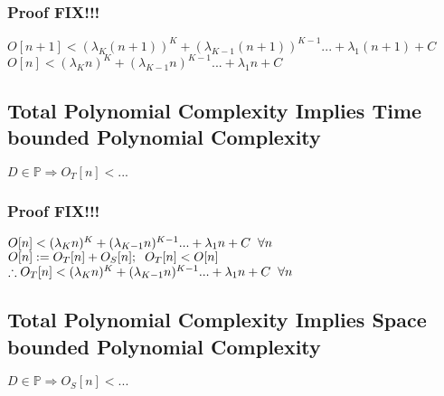 \documentclass[11pt]{article}
\begin{document}
\subsubsection{Proof FIX!!!}
\begin{center}
$
O[n+1] < (\lambda_K (n+1))^K + (\lambda_{K-1} (n+1))^{K-1}... + \lambda_1 (n+1) + C
$
\\ \vspace{2mm}
$
O[n] < (\lambda_K n)^K + (\lambda_{K-1} n)^{K-1}... + \lambda_1 n + C
$
\end{center}







\subsection{Total Polynomial Complexity Implies Time bounded Polynomial Complexity}
\begin{center}
\vspace{1mm}
$
D \in \mathbb{P} \Longrightarrow O_T[n] < ...
$
\end{center}

\subsubsection{Proof FIX!!!}
\begin{center}
$
O[n] < (\lambda_K n)^K + (\lambda_{K-1} n)^{K-1}... + \lambda_1 n + C \hspace{2mm} \forall n
$
\\ \vspace{2mm}
$
O[n] := O_T[n] + O_S[n]; \hspace{2mm} O_T[n] < O[n]
$
\\ \vspace{2mm}
$
\therefore O_T[n] < (\lambda_K n)^K + (\lambda_{K-1} n)^{K-1}... + \lambda_1 n + C \hspace{2mm} \forall n
$
\end{center}










\subsection{Total Polynomial Complexity Implies Space bounded Polynomial Complexity}
\begin{center}
\vspace{1mm}
$
D \in \mathbb{P} \Longrightarrow O_S[n] < ...
$
\end{center}
\end{document}
